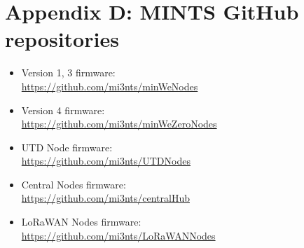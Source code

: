 \documentclass[12pt]{article}
\begin{document}
\section*{Appendix D: \textbf{MINTS} GitHub repositories}
\begin{itemize}
      \item Version 1, 3 firmware:\\\url{https://github.com/mi3nts/minWeNodes}
      \item Version 4 firmware:\\\url{https://github.com/mi3nts/minWeZeroNodes}
      \item UTD Node firmware:\\\url{https://github.com/mi3nts/UTDNodes}
      \item Central Nodes firmware:\\\url{https://github.com/mi3nts/centralHub}
      \item LoRaWAN Nodes firmware:\\\url{https://github.com/mi3nts/LoRaWANNodes}
    \end{itemize}
\end{document}
